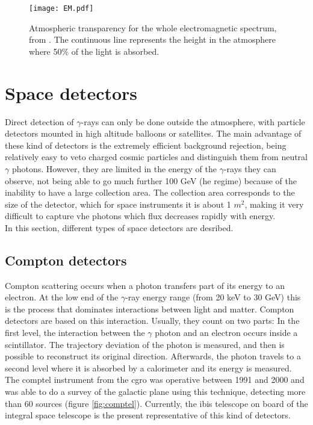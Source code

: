 \documentclass[main.tex]{subfiles}
\begin{document}
\begin{figure}
\centering
 \texttt{[image: EM.pdf]}
  \caption{Atmospheric transparency for the whole electromagnetic spectrum, from \cite{highenergyastrophy}. The continuous line represents the height in the atmosphere where 50\% of the light is absorbed.}
    \label{fig:atmoabsorb}
\end{figure}


\section{Space detectors} \label{sec:spacedet}

Direct detection of $\gamma$-rays can only be done outside the atmosphere, with particle detectors mounted in high altitude balloons or satellites. The main advantage of these kind of detectors is the extremely efficient background rejection, being relatively easy to veto charged cosmic particles and distinguish them from neutral $\gamma$ photons. However, they are limited in the energy of the $\gamma$-rays they can observe, not being able to go much further 100 GeV (\gls{he} regime) because of the inability to have a large collection area. The collection area corresponds to the size of the detector, which for space instruments it is about 1 $m^2$, making it very difficult to capture \gls{vhe} photons which flux decreases rapidly with energy.\\
In this section, different types of space detectors are desribed.\\

\subsection{Compton detectors}\label{sec:comptondetectors}

Compton scattering occurs when a photon transfers part of its energy to an electron. At the low end of the $\gamma$-ray energy range (from 20 keV to 30 GeV) this is the process that dominates interactions between light and matter. Compton detectors are based on this interaction. Usually, they count on two parts: In the first level, the interaction between the $\gamma$ photon and an electron occurs inside a scintillator. The trajectory deviation of the photon is measured, and then is possible to reconstruct its original direction. Afterwards, the photon travels to a second level where it is absorbed by a calorimeter and its energy is measured. The \gls{comptel} instrument from the \gls{cgro} was operative between 1991 and 2000 and was able to do a survey of the galactic plane using this technique, detecting more than 60 sources (figure \ref{fig:comptel}). Currently, the \gls{ibis} telescope on board of the \gls{integral} space telescope is the present representative of this kind of detectors.
\end{document}
